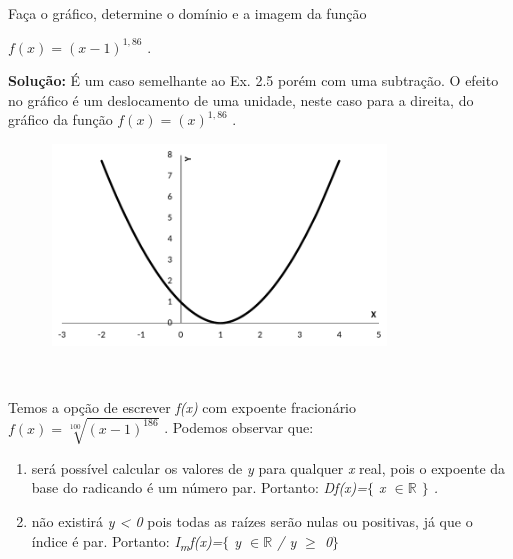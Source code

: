 \begin{texemplo}
	
Faça o gráfico, determine o domínio e a imagem da função

\quad \quad   \( f \left( x \right) = \left( x-1 \right) ^{1,86} \) .

\textbf{Solução:} É um caso semelhante ao Ex. 2.5 porém com uma subtração. O efeito no gráfico é um deslocamento de uma unidade, neste caso para a direita, do gráfico da função  \( f \left( x \right) = \left( x \right) ^{1,86} \) .

\begin{figure}[H]
	\begin{Center}
		\includegraphics[width=3.57in,height=2.1in]{capitulos/outras_funcoes/media/image9.pdf}
	\end{Center}
\end{figure}

~~

Temos a opção de escrever \textit{f(x)} com expoente fracionário  \( f \left( x \right) =\sqrt[100]{ \left( x-1 \right) ^{186}} \) . Podemos observar que: 

\begin{enumerate}
	\item será possível calcular os valores de \textit{y} para qualquer  \textit{x } real, pois o expoente da base do radicando é um número par. Portanto: \textit{Df(x)=$ \{ $  x $ \in \mathbb{R} $  \textbf{ }$ \} $ .}

	\item não existirá \textit{y < 0} pois todas as raízes serão nulas ou positivas, já que o índice é par. Portanto: \textit{I\textsubscript{m}f(x)=$ \{ $ y $ \in \mathbb{R} $   / y $ \geq $  0$ \} $  }\qedsymbol{} 
\end{enumerate}
\end{texemplo}

